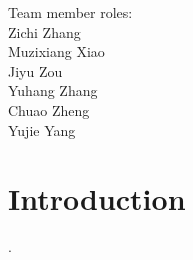 \documentclass[a4paper,12pt,reqno]{report}
\begin{document}


\vspace*{\fill}
\begin{flushleft}
    Team member roles:\\
    Zichi Zhang\\
    Muzixiang Xiao\\
    Jiyu Zou\\
    Yuhang Zhang\\
    Chuao Zheng\\
    Yujie Yang
\end{flushleft}
\vspace*{\fill}
\thispagestyle{empty}

\begin{abstract}

\end{abstract}

\section{Introduction}
\label{sec:Introduction}
\cite{Basic_Information_about_NO2}. 
\newpage

\end{document}
